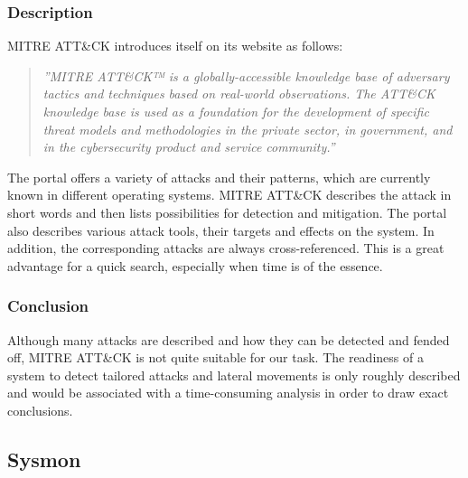 \subsubsection{Description}
MITRE ATT\&CK introduces itself on its website as follows:
\begin{quotation}
    \textit{''MITRE ATT\&CK™ is a globally-accessible knowledge base of adversary tactics and techniques based on real-world observations. The ATT\&CK knowledge base is used as a foundation for the development of specific threat models and methodologies in the private sector, in government, and in the cybersecurity product and service community.'' \cite{MITRE}} 
\end{quotation}
The portal offers a variety of attacks and their patterns, which are currently known in different operating systems. MITRE ATT\&CK describes the attack in short words and then lists possibilities for detection and mitigation. The portal also describes various attack tools, their targets and effects on the system. In addition, the corresponding attacks are always cross-referenced. This is a great advantage for a quick search, especially when time is of the essence.

\subsubsection{Conclusion}
Although many attacks are described and how they can be detected and fended off, MITRE ATT\&CK is not quite suitable for our task. The readiness of a system to detect tailored attacks and lateral movements is only roughly described and would be associated with a time-consuming analysis in order to draw exact conclusions.

\clearpage

\subsection{Sysmon}\label{Sysmon}
